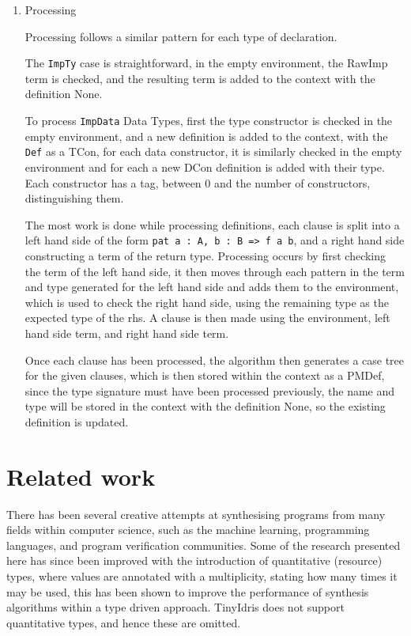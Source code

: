 \documentclass[a4paper]{article}
\begin{document}
\begin{enumerate}
\item Processing
\label{sec:orgc07206b}

Processing follows a similar pattern for each type of declaration. 

The \texttt{ImpTy} case is straightforward, in the empty environment, the
RawImp term is checked, and the resulting term is added to the context
with the definition None. 

To process \texttt{ImpData} Data Types, first the type constructor is checked
in the empty environment, and a new definition is added to the context,
with the \texttt{Def} as a TCon, for each data constructor, it is similarly 
checked in the empty environment and for each a new DCon definition is 
added with their type. Each constructor has a tag, between 0 and the
number of constructors, distinguishing them.  

The most work is done while processing definitions, each clause is
split into a left hand side of the form \texttt{pat a : A, b : B => f a b},
and a right hand side constructing a term of the return type. Processing
occurs by first checking the term of the left hand side, it then moves 
through each pattern in the term and type generated for the left hand
side and adds them to the environment, which is used to check the right
hand side, using the remaining type as the expected type of the rhs. 
A clause is then made using the environment, left hand side term, and right 
hand side term. 

Once each clause has been processed, the algorithm then generates a 
case tree for the given clauses, which is then stored within the context
as a PMDef, since the type signature must have been processed previously, 
the name and type will be stored in the context with the definition None, 
so the existing definition is updated.
\end{enumerate}

\section{Related work}
\label{sec:orgf173553}

There has been several creative attempts at synthesising programs from 
many fields within computer science, such as the machine learning,
programming languages, and program verification communities. 
Some of the research presented here has since been improved with the
introduction of quantitative (resource) types, where values are
annotated with a multiplicity, stating how many times it may be used, 
this has been shown to improve the performance of synthesis algorithms 
within a type driven approach. TinyIdris does not support quantitative
types, and hence these are omitted.
\end{document}
